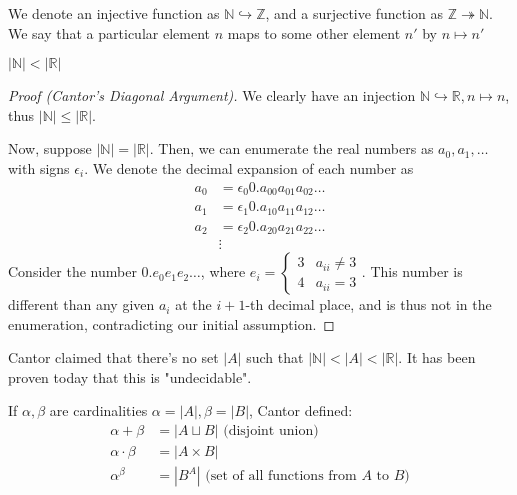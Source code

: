 \documentclass[12pt,oneside]{article}
\begin{document}
\begin{remark}
  We denote an injective function as $\mathbb{N} \hookrightarrow \mathbb{Z}$, and a surjective function as $\mathbb{Z} \twoheadrightarrow \mathbb{N}$. We say that a particular element $n$ maps to some other element $n'$ by $n \mapsto n'$
\end{remark}
\begin{theorem}[Cantor]
  $|\mathbb{N}|<|\mathbb{R}|$
\end{theorem}
\begin{proof}[Proof (Cantor's Diagonal Argument)]
  We clearly have an injection $\mathbb{N} \hookrightarrow \mathbb{R}, n \mapsto n$, thus $|\mathbb{N}|\leq|\mathbb{R}|$. 
  
  Now, suppose $|\mathbb{N}|=|\mathbb{R}|$. Then, we can enumerate the real numbers as $a_0, a_1, \dots$ with signs $\epsilon_i$. We denote the decimal expansion of each number as\footnotemark \begin{align*}
    a_0 &= \epsilon_0 0.a_{00}a_{01}a_{02}\dots\\
    a_1 &= \epsilon_1 0.a_{10}a_{11}a_{12}\dots\\
    a_2 &= \epsilon_2 0.a_{20}a_{21}a_{22}\dots\\
    &\vdots
  \end{align*} Consider the number $0.e_0e_1e_2\dots$, where $e_i = \begin{cases}
    3 & a_{ii} \neq 3\\
    4 & a_{ii} = 3
  \end{cases}.$ This number is different than any given $a_i$ at the $i+1$-th decimal place, and is thus not in the enumeration, contradicting our initial assumption.
\end{proof}

\begin{remark}
  Cantor claimed that there's no set $|A|$ such that $|\mathbb{N}| < |A| < |\mathbb{R}|$. It has been proven today that this is "undecidable".
\end{remark}

\begin{definition}
If $\alpha, \beta$ are cardinalities $\alpha = |A|, \beta = |B|$, Cantor defined:
\begin{align*}
  \alpha + \beta &= |A \sqcup B| \text{ (disjoint union)}\\ 
  \alpha \cdot \beta &= |A \times B|\\
  \alpha^\beta &= |B^A| \text{ (set of all functions from $A$ to $B$)}  
\end{align*}
\end{definition}
\end{document}
